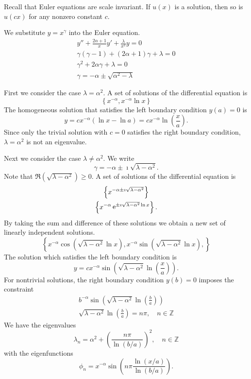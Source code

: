 {%
\begin{Solution}
  \label{solution y''+2a1xy'+lx2y=0}
  Recall that Euler equations are scale invariant.
  If $u(x)$ is a solution, then so is $u(c x)$ for any nonzero constant $c$.

  We substitute $y = x^\gamma$ into the Euler equation.
  \begin{gather*}
    y'' + \frac{2 \alpha + 1}{x} y' + \frac{\lambda}{x^2} y = 0 \\
    \gamma (\gamma-1) + (2 \alpha + 1) \gamma + \lambda = 0 \\
    \gamma^2 + 2 \alpha \gamma + \lambda = 0 \\
    \gamma = -\alpha \pm \sqrt{\alpha^2 - \lambda}
  \end{gather*}

  First we consider the case $\lambda = \alpha^2$.  A set of solutions of the 
  differential equation is
  \[
  \left\{ x^{-\alpha}, x^{-\alpha} \ln x \right\}
  \]
  The homogeneous solution that satisfies the left boundary condition 
  $y(a) = 0$ is
  \[
  y = c x^{-\alpha} (\ln x - \ln a) 
  = c x^{-\alpha} \ln \left( \frac{x}{a} \right).
  \]
  Since only the trivial solution with $c = 0$ satisfies the right boundary 
  condition, $\lambda = \alpha^2$ is not an eigenvalue.

  Next we consider the case $\lambda \neq \alpha^2$.  
  We write 
  \[
  \gamma = -\alpha \pm \imath \sqrt{\lambda - \alpha^2}.
  \]
  Note that $\Re(\sqrt{\lambda - \alpha^2}) \geq 0$.
  A set of solutions of the differential equation is
  \begin{gather*}
    \left\{ x^{-\alpha \pm \imath \sqrt{\lambda - \alpha^2}}  \right\} \\
    \left\{ x^{-\alpha} \mathop{\mathrm{e}}\nolimits^{ \pm \imath \sqrt{\lambda - \alpha^2} \ln x}  \right\}.
  \end{gather*}
  By taking the sum and difference of these solutions we obtain a new set
  of linearly independent solutions.
  \[
  \left\{
    x^{-\alpha} \cos \left( \sqrt{\lambda - \alpha^2} \ln x \right),
    x^{-\alpha} \sin \left( \sqrt{\lambda - \alpha^2} \ln x \right),
  \right\}
  \]
  The solution which satisfies the left boundary condition is
  \[
  y = c x^{-\alpha} \sin \left( \sqrt{\lambda - \alpha^2} 
    \ln \left( \frac{x}{a} \right) \right).
  \]
  For nontrivial solutions, the right boundary condition $y(b) = 0$ 
  imposes the constraint
  \begin{gather*}
    b^{-\alpha} \sin \left( \sqrt{\lambda - \alpha^2} 
      \ln \left( \frac{b}{a} \right) \right) \\
    \sqrt{\lambda - \alpha^2} \ln \left( \frac{b}{a} \right) 
    = n \pi, \quad n \in \mathbb{Z} 
  \end{gather*}
  We have the eigenvalues
  \[
  \boxed{
    \lambda_n = \alpha^2 + \left( \frac{n \pi}{\ln(b/a)} \right)^2, 
    \quad n \in \mathbb{Z}
    }
  \]
  with the eigenfunctions
  \[
  \boxed{
    \phi_n = x^{-\alpha} \sin \left( n \pi \frac{\ln(x/a)}{\ln(b/a)} \right).
    }
  \]


\end{Solution}}
